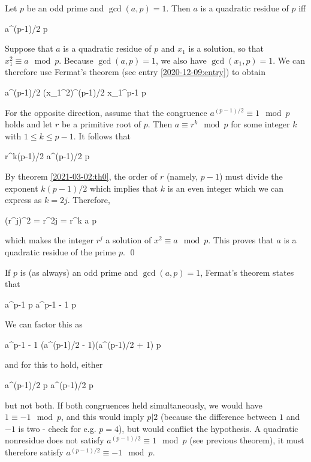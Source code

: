 \begin{theorem}
Let $p$ be an odd prime and $\gcd(a,p)=1$. Then $a$ is a quadratic residue of $p$ iff

\bee
a^{(p-1)/2}  \mod p
\eee
\end{theorem}

Suppose that $a$ is a quadratic residue of $p$ and $x_1$ is a solution, so that $x_1^2 \equiv a \mod p$. Because $\gcd(a,p) = 1$, we also have $\gcd(x_1,p) = 1$. We can therefore use Fermat's theorem (see entry \ref{2020-12-09:entry}) to obtain

\bee
a^{(p-1)/2} \equiv (x_1^2)^{(p-1)/2} \equiv x_1^{p-1}  \mod p
\eee

For the opposite direction, assume that the congruence $a^{(p-1)/2} \equiv 1 \mod p$ holds and let $r$ be a primitive root of $p$. Then $a \equiv r^k \mod p$ for some integer $k$ with $1 \leq k \leq p-1$. It follows that

\bee
r^{k(p-1)/2} \equiv a^{(p-1)/2}  \mod p
\eee

By theorem \ref{2021-03-02:th0}, the order of $r$ (namely, $p-1$) must divide the exponent $k(p-1)/2$ which implies that $k$ is an even integer which we can express as $k = 2j$. Therefore,

\bee
(r^j)^2 = r^{2j} = r^k \equiv  a \mod p
\eee

which makes the integer $r^j$ a solution of $x^2 \equiv a \mod p$. This proves that $a$ is a quadratic residue of the prime $p$. \qed

If $p$ is (as always) an odd prime and $\gcd(a,p) = 1$, Fermat's theorem states that

\bee
a^{p-1}  \mod p \rightarrow a^{p-1} - 1  \mod p
\eee

We can factor this as

\bee
a^{p-1} - 1 \equiv \left(a^{(p-1)/2} - 1\right)\left(a^{(p-1)/2} + 1\right)  \mod p
\eee

and for this to hold, either

\bee
a^{(p-1)/2}  \mod p \qquad a^{(p-1)/2}  \mod p
\eee

but not both. If both congruences held simultaneously, we would have $1 \equiv -1 \mod p$, and this would imply $p | 2$ (because the difference between $1$ and $-1$ is two - check for e.g. $p=4$), but would conflict the hypothesis. A quadratic nonresidue does not satisfy $a^{(p-1)/2} \equiv 1 \mod p$ (see previous theorem), it must therefore satisfy $a^{(p-1)/2} \equiv -1 \mod p$.

